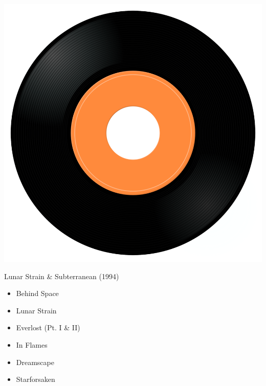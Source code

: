 \begin{minipage}[t]{0.25\textwidth}\vspace{0pt}
\vspace{0pt}
\captionsetup{type=figure}
\includegraphics[width=\textwidth]{Images/cover.png}
\caption*{Lunar Strain \& Subterranean (1994)}
\end{minipage}
\begin{minipage}[t]{0.25\textwidth}\vspace{0pt}
\vspace{0pt}
\begin{itemize}[nosep,leftmargin=1em,labelwidth=*,align=left]
	\setlength{\itemsep}{0pt}
	\item Behind Space
	\item Lunar Strain
	\item Everlost (Pt. I \& II)
	\item In Flames
	\item Dreamscape
	\item Starforsaken
\end{itemize}
\end{minipage}
